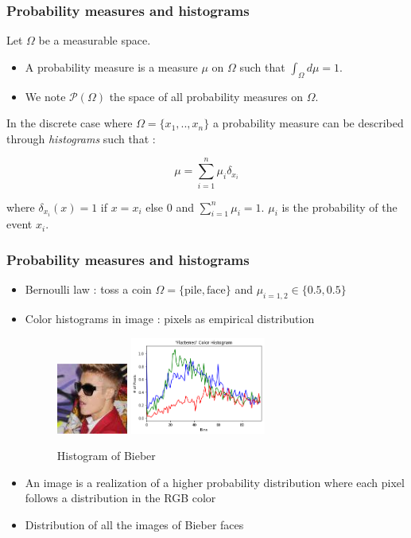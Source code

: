 \documentclass[french,9pt]{beamer}
\begin{document}
\begin{frame}
\frametitle{Probability measures and histograms}

Let $\Omega$ be a measurable space.
\begin{itemize}
\item A probability measure is a measure $\mu$ on $\Omega$ such that $\int_{\Omega} d\mu=1$.
\item We note $\mathcal{P}(\Omega)$ the space of all probability measures on $\Omega$.
\end{itemize}

In the discrete case where  $\Omega=\{x_{1},..,x_{n}\}$ a probability measure can be described through \emph{histograms} such that :

$$\mu=\sum_{i=1}^{n} \mu_{i} \delta_{x_{i}} $$

 where $\delta_{x_{i}}(x)=1$ if $x=x_{i}$ else $0$ and $\sum_{i=1}^{n} \mu_{i}=1$. $\mu_{i}$ is the probability of the event $x_{i}$. 


\end{frame}





\begin{frame}
\frametitle{Probability measures and histograms}

\begin{itemize}
\item Bernoulli law : toss a coin $\Omega=\{\text{pile},\text{face}\}$ and $\mu_{i=1,2} \in \{0.5,0.5\}$
\item Color histograms in image : pixels as empirical distribution
\begin{figure}
  \begin{center}
    \includegraphics[width=0.22\textwidth]{fig/biber.png}\hspace{1mm}
     \includegraphics[width=0.42\textwidth]{fig/hist_biber.png}
  \end{center}
 \caption{Histogram of Bieber}
\end{figure}
\item An image is a realization of a higher probability distribution where each pixel follows a distribution in the RGB color
\item Distribution of all the images of Bieber faces 
\end{itemize}
\end{frame}
\end{document}
